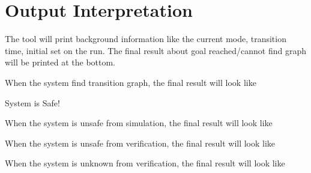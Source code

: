 \documentclass[letterpaper,10pt,english]{sphinxmanual}
\begin{document}
\begin{sphinxVerbatim}[commandchars=\\\{\}]
\end{sphinxVerbatim}


\section{Output Interpretation}
\label{\detokenize{dryvr's_language:output-interpretation}}
The tool will print background information like the current mode, transition time, initial set on the run. The final result about goal reached/cannot find graph will be printed at the bottom.

When the system find transition graph, the final result will look like

\begin{sphinxVerbatim}[commandchars=\\\{\}]
System is Safe!
\end{sphinxVerbatim}

When the system is unsafe from simulation, the final result will look like

\begin{sphinxVerbatim}[commandchars=\\\{\}]
      
\end{sphinxVerbatim}

When the system is unsafe from verification, the final result will look like

\begin{sphinxVerbatim}[commandchars=\\\{\}]
      \PYG{p}{[} \PYG{p}{]}
\end{sphinxVerbatim}

When the system is unknown from verification, the final result will look like

\begin{sphinxVerbatim}[commandchars=\\\{\}]
      
\end{sphinxVerbatim}
\end{document}
